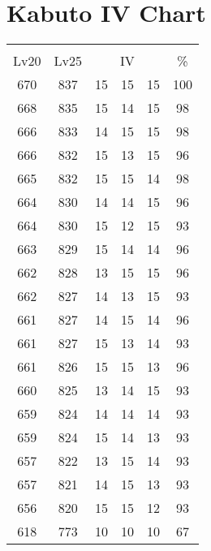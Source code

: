 \documentclass{article}%
\begin{document}
%
\normalsize%
\section{Kabuto IV Chart}%
\label{sec:Kabuto IV Chart}%
\renewcommand{\arraystretch}{1.5}%
\begin{tabular}{|c|c|c|c|c|c|}%
\hline%
\multicolumn{6}{|c|}{\textcolor{white}{ 
\linebreak{Kabuto}
}%
\cellcolor{black}}\\%
\multicolumn{1}{|c}{Lv20}&\multicolumn{1}{c|}{Lv25}&\multicolumn{3}{c|}{IV}&\multicolumn{1}{|c|}{\%}\\%
\hline%
\rowcolor{color100}%
670&837&15&15&15&100\\%
\hline%
\rowcolor{color98}%
668&835&15&14&15&98\\%
\hline%
\rowcolor{color98}%
666&833&14&15&15&98\\%
\hline%
\rowcolor{color96}%
666&832&15&13&15&96\\%
\hline%
\rowcolor{color98}%
665&832&15&15&14&98\\%
\hline%
\rowcolor{color96}%
664&830&14&14&15&96\\%
\hline%
\rowcolor{color93}%
664&830&15&12&15&93\\%
\hline%
\rowcolor{color96}%
663&829&15&14&14&96\\%
\hline%
\rowcolor{color96}%
662&828&13&15&15&96\\%
\hline%
\rowcolor{color93}%
662&827&14&13&15&93\\%
\hline%
\rowcolor{color96}%
661&827&14&15&14&96\\%
\hline%
\rowcolor{color93}%
661&827&15&13&14&93\\%
\hline%
\rowcolor{color96}%
661&826&15&15&13&96\\%
\hline%
\rowcolor{color93}%
660&825&13&14&15&93\\%
\hline%
\rowcolor{color93}%
659&824&14&14&14&93\\%
\hline%
\rowcolor{color93}%
659&824&15&14&13&93\\%
\hline%
\rowcolor{color93}%
657&822&13&15&14&93\\%
\hline%
\rowcolor{color93}%
657&821&14&15&13&93\\%
\hline%
\rowcolor{color93}%
656&820&15&15&12&93\\%
\hline%
\rowcolor{color91}%
618&773&10&10&10&67\\%
\end{tabular}

%
\end{document}
